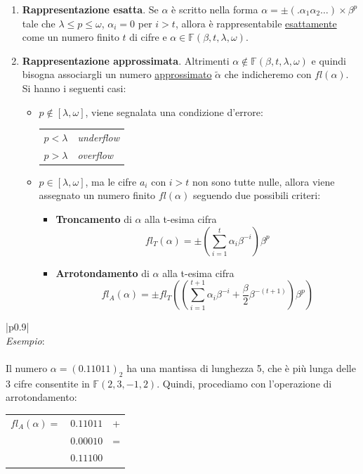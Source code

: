 \documentclass{article}
\numberwithin{equation}{section}
\newenvironment{example}
{\begin{center}
        \begin{tabular}{|p{0.9\textwidth}|}
            \hline \\ 
            \textit{Esempio}: \\\\ 
        }
        {
            \\\\ \hline
        \end{tabular}
    \end{center}
}
\begin{document}
\begin{enumerate}
    \item \textbf{Rappresentazione esatta}. Se $\alpha$ è scritto nella forma
        $\alpha=\pm(.\alpha_1\alpha_2\ldots)\times\beta^{p}$ tale che
        $\lambda\leq p\leq\omega$, $\alpha_i=0$ per $i> t$, allora è
        rappresentabile \underline{esattamente} come un numero finito $t$ di
        cifre e $\alpha\in \mathbb{F}(\beta,t,\lambda,\omega)$.
    \item \textbf{Rappresentazione approssimata}. Altrimenti 
        $\alpha\notin \mathbb{F}(\beta,t,\lambda,\omega)$ e quindi
        bisogna associargli un numero \underline{approssimato} $\tilde\alpha$
        che indicheremo con $fl(\alpha)$. Si hanno i seguenti casi:
        \begin{itemize}
            \item $p\notin[\lambda,\omega]$, viene segnalata una condizione
                d'errore:
                \begin{center}
                    \begin{tabular}{ll}
                        $p<\lambda$ & \textit{underflow} \\ 
                        $p>\lambda$ & \textit{overflow} \\ 
                   \end{tabular} 
                \end{center}
            \item $p\in[\lambda,\omega]$, ma le cifre $a_i$ con $i>t$ non sono
                tutte nulle, allora viene assegnato un numero finito $fl(\alpha)$
                seguendo due possibili criteri:
                \begin{itemize}
                    \item\textbf{Troncamento} di $\alpha$ alla t-esima cifra
                        $$fl_{T}(\alpha)=\pm(\sum_{i=1}^{t}\alpha_i\beta^{-i})\beta^p$$
                    \item\textbf{Arrotondamento} di $\alpha$ alla t-esima cifra 
                        $$fl_{A}(\alpha)=\pm
                        fl_{T}((\sum_{i=1}^{t+1}\alpha_i\beta^{-i}+\frac{\beta}{2}\beta^{-(t+1)})\beta^p)$$
                \end{itemize}
        \end{itemize}
\end{enumerate}
\begin{example}
    Il numero $\alpha=(0.11011)_2$ ha una mantissa di lunghezza 5, che è più
    lunga delle 3 cifre consentite in $\mathbb{F}(2,3,-1,2)$. Quindi, procediamo
    con l'operazione di arrotondamento:
    \begin{center}
       \begin{tabular}{lll}
           $fl_{A}(\alpha)=$ & $0.11011$ & + \\ 
                        & $0.00010$ & = \\ 
                        \hline
                        & $0.11100$ & \\ 
       \end{tabular} 
    \end{center}
\end{example}
\end{document}
